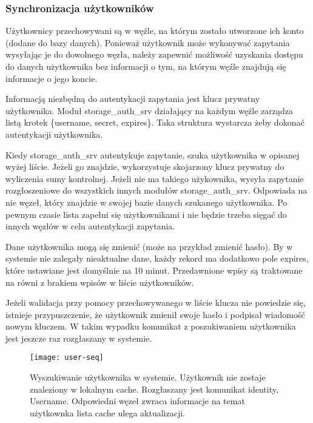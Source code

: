 \subsubsection{Synchronizacja użytkowników}
Użytkownicy przechowywani są w węźle, na którym zostało utworzone ich konto (dodane do bazy danych). Ponieważ użytkownik może wykonywać zapytania wysyłając je do dowolnego węzła, należy zapewnić możliwość uzyskania dostępu do danych użytkownika bez informacji o tym, na którym węźle znajdują się informacje o jego koncie.

Informacją niezbędną do autentykacji zapytania jest klucz prywatny użytkownika. Moduł storage\_auth\_srv działający na każdym węźle zarządza listą krotek \{username, secret, expires\}. Taka struktura wystarcza żeby dokonać autentykacji użytkownika.

Kiedy storage\_auth\_srv autentykuje zapytanie, szuka użytkownika w opisanej wyżej liście. Jeżeli go znajdzie, wykorzystuje skojarzony klucz prywatny do wyliczenia sumy kontrolnej. Jeżeli nie ma takiego użykownika, wysyła zapytanie rozgłoszeniowe do wszystkich innych modułów storage\_auth\_srv. Odpowiada na nie węzeł, który znajdzie w swojej bazie danych szukanego użytkownika. Po pewnym czasie lista zapełni się użytkownikami i nie będzie trzeba sięgać do innych węzłów w celu autentykacji zapytania.

Dane użytkownika mogą się zmienić (może na przykład zmienić hasło). By w systemie nie zalegały nieaktualne dane, każdy rekord ma dodatkowo pole expires, które ustawiane jest domyślnie na 10 minut. Przedawnione wpisy są traktowane na równi z brakiem wpisów w liście użytkowników.

Jeżeli walidacja przy pomocy przechowywanego w liście klucza nie powiedzie się, istnieje przypuszczenie, że użytkownik zmienił swoje hasło i podpisał wiadomość nowym kluczem. W takim wypadku komunikat z poszukiwaniem użytkownika jest jeszcze raz rozgłaszany w systemie.

\begin{figure}[!htbp]
	\centering
	\texttt{[image: user-seq]}
	\caption[Wyszukiwanie użytkownika w systemie.]{Wyszukiwanie użytkownika w systemie. Użytkownik nie zostaje znaleziony w lokalnym cache. Rozgłaszany jest komunikat {identity, Username}. Odpowiedni węzeł zwraca informacje na temat użytkownka lista cache ulega aktualizacji.}
	\label{fig:user-seq}
\end{figure}